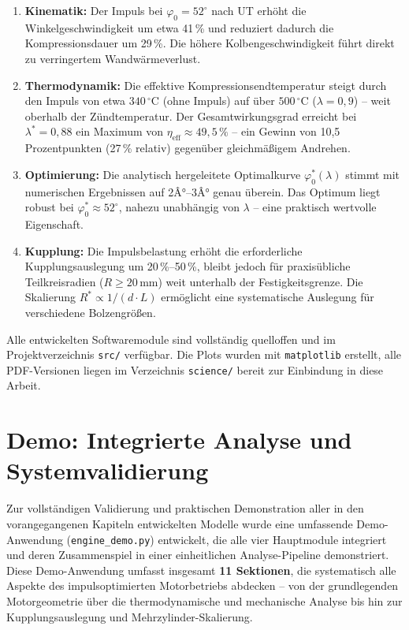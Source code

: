 ﻿\documentclass[a4paper,12pt]{article}
\begin{document}
\begin{enumerate}
  \item \textbf{Kinematik:} Der Impuls bei $\varphi_0 = 52^\circ$ nach UT
    erhöht die Winkelgeschwindigkeit um etwa 41\,\% und reduziert dadurch
    die Kompressionsdauer um 29\,\%. Die höhere Kolbengeschwindigkeit führt
    direkt zu verringertem Wandwärmeverlust.

  \item \textbf{Thermodynamik:} Die effektive Kompressionsendtemperatur
    steigt durch den Impuls von etwa $340\,^\circ\text{C}$ (ohne Impuls)
    auf über $500\,^\circ\text{C}$ ($\lambda = 0{,}9$) -- weit oberhalb der
    Zündtemperatur. Der Gesamtwirkungsgrad erreicht bei $\lambda^* = 0{,}88$
    ein Maximum von $\eta_\text{eff} \approx 49{,}5\,\%$ -- ein Gewinn von
    10{,}5 Prozentpunkten (27\,\% relativ) gegenüber gleichmäßigem Andrehen.

  \item \textbf{Optimierung:} Die analytisch hergeleitete Optimalkurve
    $\varphi_0^*(\lambda)$ stimmt mit numerischen Ergebnissen auf 2Â°--3Â° genau
    überein. Das Optimum liegt robust bei $\varphi_0^* \approx 52^\circ$,
    nahezu unabhängig von $\lambda$ -- eine praktisch wertvolle Eigenschaft.

  \item \textbf{Kupplung:} Die Impulsbelastung erhöht die erforderliche
    Kupplungsauslegung um 20\,\%--50\,\%, bleibt jedoch für praxisübliche
    Teilkreisradien ($R \geq 20\,\text{mm}$) weit unterhalb der Festigkeitsgrenze.
    Die Skalierung $R^* \propto 1/(d \cdot L)$ ermöglicht eine systematische
    Auslegung für verschiedene Bolzengrößen.
\end{enumerate}

Alle entwickelten Softwaremodule sind vollständig quelloffen und im
Projektverzeichnis \texttt{src/} verfügbar. Die Plots wurden mit
\texttt{matplotlib} erstellt, alle PDF-Versionen liegen im Verzeichnis
\texttt{science/} bereit zur Einbindung in diese Arbeit.

\section{Demo: Integrierte Analyse und Systemvalidierung}
\label{sec:demo}

Zur vollständigen Validierung und praktischen Demonstration aller in den
vorangegangenen Kapiteln entwickelten Modelle wurde eine umfassende
Demo-Anwendung (\texttt{engine\_demo.py}) entwickelt, die alle vier
Hauptmodule integriert und deren Zusammenspiel in einer einheitlichen
Analyse-Pipeline demonstriert. Diese Demo-Anwendung umfasst insgesamt
\textbf{11 Sektionen}, die systematisch alle Aspekte des impulsoptimierten
Motorbetriebs abdecken -- von der grundlegenden Motorgeometrie über die
thermodynamische und mechanische Analyse bis hin zur Kupplungsauslegung
und Mehrzylinder-Skalierung.
\end{document}
